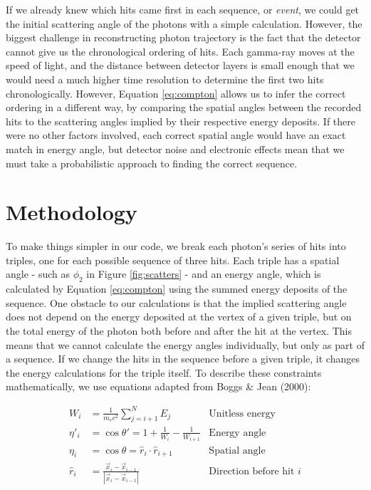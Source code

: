 If we already knew which hits came first in each sequence, or \textit{event}, we could get the initial scattering angle of the photons with a simple calculation. However, the biggest challenge in reconstructing photon trajectory is the fact that the detector cannot give us the chronological ordering of hits. Each gamma-ray moves at the speed of light, and the distance between detector layers is small enough that we would need a much higher time resolution to determine the first two hits chronologically. However, Equation \ref{eq:compton} allows us to infer the correct ordering in a different way, by comparing the spatial angles between the recorded hits to the scattering angles implied by their respective energy deposits. If there were no other factors involved, each correct spatial angle would have an exact match in energy angle, but detector noise and electronic effects mean that we must take a probabilistic approach to finding the correct sequence.

\section{Methodology}
To make things simpler in our code, we break each photon's series of hits into triples, one for each possible sequence of three hits. Each triple has a spatial angle - such as $\phi_2$ in Figure \ref{fig:scatters} - and an energy angle, which is calculated by Equation \ref{eq:compton} using the summed energy deposits of the sequence. One obstacle to our calculations is that the implied scattering angle does not depend on the energy deposited at the vertex of a given triple, but on the total energy of the photon both before and after the hit at the vertex. This means that we cannot calculate the energy angles individually, but only as part of a sequence. If we change the hits in the sequence before a given triple, it changes the energy calculations for the triple itself. To describe these constraints mathematically, we use equations adapted from Boggs \& Jean (2000)\cite{Boggs}:

\begin{align}
    W_i &= \frac{1}{m_ec^2}\sum_{j=i+1}^N E_j & \text{Unitless energy}\\
    \label{eq:new_compton}\eta'_i &= \cos\theta' = 1+\frac{1}{W_i}-\frac{1}{W_{i+1}} &\text{Energy angle}\\
    \eta_i &= \cos\theta = \hat{r}_i \cdot \hat{r}_{i+1} &\text{Spatial angle} \label{eq:eta}\\
    \hat{r}_i &= \frac{\vec{x}_i - \vec{x}_{i-1}}{|\vec{x}_i - \vec{x}_{i-1}|} & \text{Direction before hit $i$}
\end{align}

